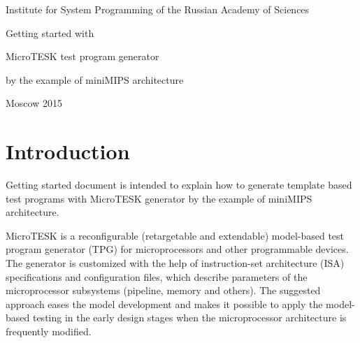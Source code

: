 \documentclass[oneside,final,12pt]{extreport}
\begin{document}
\begin{titlepage}
\begin{center}
\Large{Institute for System Programming of the Russian Academy of Sciences}
\end{center}

\vfill


\LARGE

\bf  
\centerline{Getting started with}
\centerline{MicroTESK test program generator}
\centerline{by the example of miniMIPS architecture}

\mdseries

\vfill
\thispagestyle{empty}
\normalsize

\bf  
\centerline{Moscow 2015}
\mdseries

\bigskip
\bigskip


\end{titlepage}

\newpage



\tableofcontents

%


\bigskip
\bigskip
\bigskip
\bigskip

\newpage



\section*{Introduction}

\bigskip

Getting started document is intended to explain how to generate template based test programs with MicroTESK generator by the example of miniMIPS architecture. 


\bigskip


MicroTESK is a reconfigurable (retargetable and extendable) model-based test program generator (TPG) for microprocessors and other programmable devices. The generator is customized with the help of instruction-set architecture (ISA) specifications and configuration files, which describe parameters of the microprocessor subsystems (pipeline, memory and others). The suggested approach eases the model development and makes it possible to apply the model-based testing in the early design stages when the microprocessor architecture is frequently modified.
\end{document}
